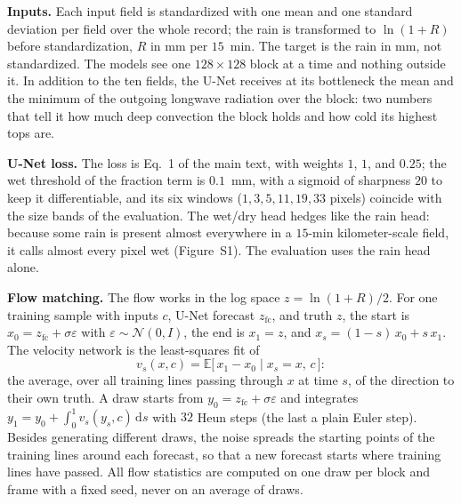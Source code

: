 \documentclass[11pt]{article}
\begin{document}
\textbf{Inputs.} Each input field is standardized with one mean and one
standard deviation per field over the whole record; the rain is
transformed to $\ln(1 + R)$ before standardization, $R$ in mm per
$15$~min. The target is the rain in mm, not standardized. The models see
one $128 \times 128$ block at a time and nothing outside it. In addition to
the ten fields, the U-Net receives at its bottleneck the mean and the
minimum of the outgoing longwave radiation over the block: two numbers that
tell it how much deep convection the block holds and how cold its highest
tops are.

\textbf{U-Net loss.} The loss is Eq.~1 of the main text, with weights
$1$, $1$, and $0.25$; the wet threshold of the fraction term is
$0.1$~mm, with a sigmoid of sharpness $20$ to keep it differentiable, and
its six windows ($1, 3, 5, 11, 19, 33$ pixels) coincide with the size
bands of the evaluation. The wet/dry head hedges like the rain head:
because some rain is present almost everywhere in a $15$-min
kilometer-scale field, it calls almost every pixel wet (Figure~S1). The
evaluation uses the rain head alone.

\textbf{Flow matching.} The flow works in the log space $z = \ln(1 + R)/2$.
For one training sample with inputs $c$, U-Net forecast $z_{\mathrm{fc}}$,
and truth $z$, the start is $x_0 = z_{\mathrm{fc}} + \sigma\varepsilon$
with $\varepsilon \sim \mathcal{N}(0, I)$, the end is $x_1 = z$, and
$x_s = (1 - s)\,x_0 + s\,x_1$. The velocity network is the least-squares
fit of
\begin{equation}
v_s(x, c) = \mathbb{E}\big[\,x_1 - x_0 \;\big|\; x_s = x,\, c\,\big] :
\end{equation}
the average, over all training lines passing through $x$ at time $s$, of
the direction to their own truth. A draw starts from
$y_0 = z_{\mathrm{fc}} + \sigma\varepsilon$ and integrates
$y_1 = y_0 + \int_0^1 v_s(y_s, c)\,\mathrm{d}s$ with $32$ Heun steps (the
last a plain Euler step). Besides generating different draws, the noise
spreads the starting points of the training lines around each forecast,
so that a new forecast starts where training lines have passed. All flow
statistics are computed on one draw per block and frame with a fixed seed,
never on an average of draws.
\end{document}
